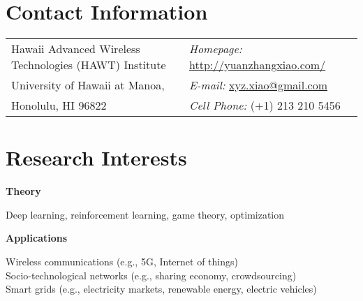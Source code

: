 \documentclass[margin,line]{res}
\newenvironment{list1}{
  \begin{list}{\ding{113}}{%
      \setlength{\itemsep}{0in}
      \setlength{\parsep}{0in} \setlength{\parskip}{0in}
      \setlength{\topsep}{0in} \setlength{\partopsep}{0in}
      \setlength{\leftmargin}{0.17in}}}{\end{list}}
\begin{document}

\begin{resume}



\section{\sc Contact Information}
\vspace{.05in}
\begin{tabular}{@{}p{3.5in}p{4in}}
Hawaii Advanced Wireless Technologies (HAWT) Institute         & {\it Homepage:}  \href{http://yuanzhangxiao.com/}{http://yuanzhangxiao.com/} \\
University of Hawaii at Manoa, & {\it E-mail:}  \href{mailto:xyz.xiao@gmail.com}{xyz.xiao@gmail.com} \\
Honolulu, HI 96822              & {\it Cell Phone:}  (+1) 213 210 5456 \\
\end{tabular}


\section{\sc Research Interests}
\vspace*{.1in}
{\bf Theory}\\
\vspace*{-.1in}
\begin{list1}
\item[] Deep learning, reinforcement learning, game theory, optimization
\end{list1}
\vspace*{-.1in}
{\bf Applications}\\
\vspace*{-.1in}
\begin{list1}
\item[]  Wireless communications (e.g., 5G, Internet of things) \\
Socio-technological networks (e.g., sharing economy, crowdsourcing) \\
Smart grids (e.g., electricity markets, renewable energy, electric vehicles)
\end{list1}




\end{resume}
\end{document}
